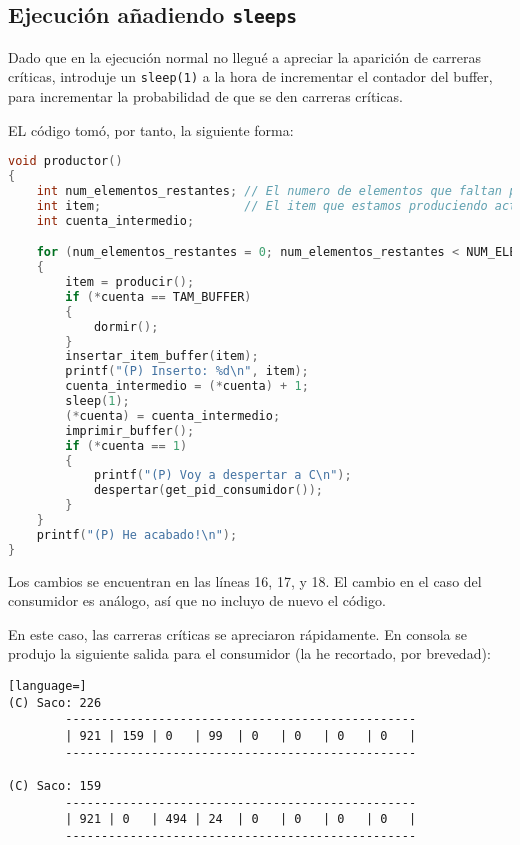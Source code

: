\documentclass[a4paper]{article}
\begin{document}
\subsection{Ejecución añadiendo \texttt{sleeps}}

Dado que en la ejecución normal no llegué a apreciar la aparición de carreras críticas, introduje un \texttt{sleep(1)} a la hora de incrementar el contador del buffer, para incrementar la probabilidad de que se den carreras críticas.

EL código tomó, por tanto, la siguiente forma:

\begin{lstlisting}[language=C]
void productor()
{
    int num_elementos_restantes; // El numero de elementos que faltan por producir
    int item;                    // El item que estamos produciendo actualmente
    int cuenta_intermedio;

    for (num_elementos_restantes = 0; num_elementos_restantes < NUM_ELEMENTOS_TOTALES; num_elementos_restantes++)
    {
        item = producir();
        if (*cuenta == TAM_BUFFER)
        {
            dormir();
        }
        insertar_item_buffer(item);
        printf("(P) Inserto: %d\n", item);
        cuenta_intermedio = (*cuenta) + 1;
        sleep(1);
        (*cuenta) = cuenta_intermedio;
        imprimir_buffer();
        if (*cuenta == 1)
        {
            printf("(P) Voy a despertar a C\n");
            despertar(get_pid_consumidor());
        }
    }
    printf("(P) He acabado!\n");
}
\end{lstlisting}

Los cambios se encuentran en las líneas 16, 17, y 18. El cambio en el caso del consumidor es análogo, así que no incluyo de nuevo el código.

En este caso, las carreras críticas se apreciaron rápidamente. En consola se produjo la siguiente salida para el consumidor (la he recortado, por brevedad):

\begin{lstlisting}[language=]
(C) Saco: 226
        -------------------------------------------------
        | 921 | 159 | 0   | 99  | 0   | 0   | 0   | 0   |
        -------------------------------------------------
        
(C) Saco: 159
        -------------------------------------------------
        | 921 | 0   | 494 | 24  | 0   | 0   | 0   | 0   |
        -------------------------------------------------
\end{lstlisting}
\end{document}
